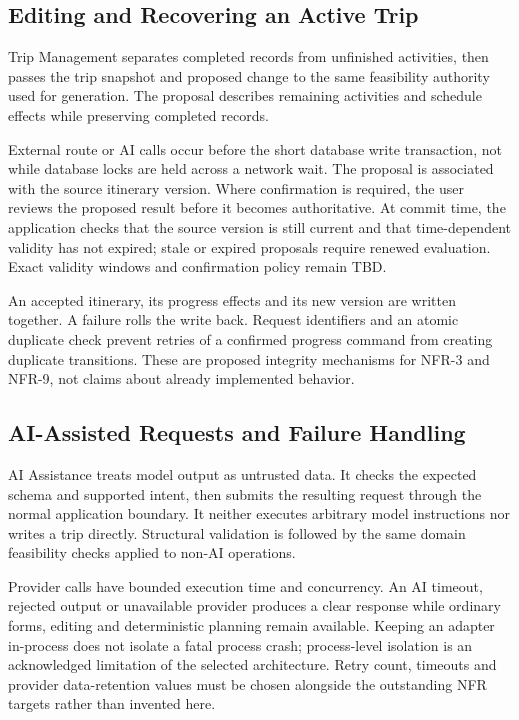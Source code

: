 \subsection{Editing and Recovering an Active Trip}
Trip Management separates completed records from unfinished activities, then passes the trip snapshot and proposed change to the same feasibility authority used for generation. The proposal describes remaining activities and schedule effects while preserving completed records.

External route or AI calls occur before the short database write transaction, not while database locks are held across a network wait. The proposal is associated with the source itinerary version. Where confirmation is required, the user reviews the proposed result before it becomes authoritative. At commit time, the application checks that the source version is still current and that time-dependent validity has not expired; stale or expired proposals require renewed evaluation. Exact validity windows and confirmation policy remain TBD.

An accepted itinerary, its progress effects and its new version are written together. A failure rolls the write back. Request identifiers and an atomic duplicate check prevent retries of a confirmed progress command from creating duplicate transitions. These are proposed integrity mechanisms for NFR-3 and NFR-9, not claims about already implemented behavior.

\subsection{AI-Assisted Requests and Failure Handling}
AI Assistance treats model output as untrusted data. It checks the expected schema and supported intent, then submits the resulting request through the normal application boundary. It neither executes arbitrary model instructions nor writes a trip directly. Structural validation is followed by the same domain feasibility checks applied to non-AI operations.

Provider calls have bounded execution time and concurrency. An AI timeout, rejected output or unavailable provider produces a clear response while ordinary forms, editing and deterministic planning remain available. Keeping an adapter in-process does not isolate a fatal process crash; process-level isolation is an acknowledged limitation of the selected architecture. Retry count, timeouts and provider data-retention values must be chosen alongside the outstanding NFR targets rather than invented here.

